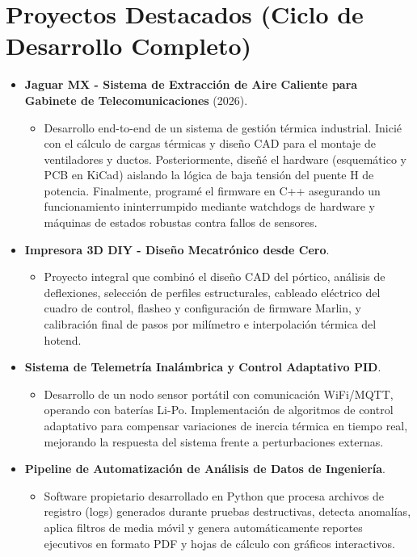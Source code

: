 \documentclass[10pt,letterpaper]{article}
\begin{document}
\section*{Proyectos Destacados (Ciclo de Desarrollo Completo)}
\begin{itemize}[leftmargin=*, itemsep=0.5ex]
    \item \textbf{Jaguar MX - Sistema de Extracción de Aire Caliente para Gabinete de Telecomunicaciones} (2026).
    \begin{itemize}[itemsep=0.1ex]
        \item Desarrollo end-to-end de un sistema de gestión térmica industrial. Inicié con el cálculo de cargas térmicas y diseño CAD para el montaje de ventiladores y ductos. Posteriormente, diseñé el hardware (esquemático y PCB en KiCad) aislando la lógica de baja tensión del puente H de potencia. Finalmente, programé el firmware en C++ asegurando un funcionamiento ininterrumpido mediante watchdogs de hardware y máquinas de estados robustas contra fallos de sensores.
    \end{itemize}
    \item \textbf{Impresora 3D DIY - Diseño Mecatrónico desde Cero}.
    \begin{itemize}[itemsep=0.1ex]
        \item Proyecto integral que combinó el diseño CAD del pórtico, análisis de deflexiones, selección de perfiles estructurales, cableado eléctrico del cuadro de control, flasheo y configuración de firmware Marlin, y calibración final de pasos por milímetro e interpolación térmica del hotend.
    \end{itemize}
    \item \textbf{Sistema de Telemetría Inalámbrica y Control Adaptativo PID}.
    \begin{itemize}[itemsep=0.1ex]
        \item Desarrollo de un nodo sensor portátil con comunicación WiFi/MQTT, operando con baterías Li-Po. Implementación de algoritmos de control adaptativo para compensar variaciones de inercia térmica en tiempo real, mejorando la respuesta del sistema frente a perturbaciones externas.
    \end{itemize}
    \item \textbf{Pipeline de Automatización de Análisis de Datos de Ingeniería}.
    \begin{itemize}[itemsep=0.1ex]
        \item Software propietario desarrollado en Python que procesa archivos de registro (logs) generados durante pruebas destructivas, detecta anomalías, aplica filtros de media móvil y genera automáticamente reportes ejecutivos en formato PDF y hojas de cálculo con gráficos interactivos.
    \end{itemize}
\end{itemize}
\end{document}
